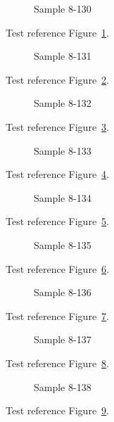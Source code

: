 \begin{figure}[tbhp]
\caption{Sample 8-130}
\label{fig:sample-8-130}
\end{figure}

Test reference Figure~\ref{fig:sample-8-130}.

\begin{figure}[tbhp]
\caption{Sample 8-131}
\label{fig:sample-8-131}
\end{figure}

Test reference Figure~\ref{fig:sample-8-131}.

\begin{figure}[tbhp]
\caption{Sample 8-132}
\label{fig:sample-8-132}
\end{figure}

Test reference Figure~\ref{fig:sample-8-132}.

\begin{figure}[tbhp]
\caption{Sample 8-133}
\label{fig:sample-8-133}
\end{figure}

Test reference Figure~\ref{fig:sample-8-133}.

\begin{figure}[tbhp]
\caption{Sample 8-134}
\label{fig:sample-8-134}
\end{figure}

Test reference Figure~\ref{fig:sample-8-134}.

\begin{figure}[tbhp]
\caption{Sample 8-135}
\label{fig:sample-8-135}
\end{figure}

Test reference Figure~\ref{fig:sample-8-135}.

\begin{figure}[tbhp]
\caption{Sample 8-136}
\label{fig:sample-8-136}
\end{figure}

Test reference Figure~\ref{fig:sample-8-136}.

\begin{figure}[tbhp]
\caption{Sample 8-137}
\label{fig:sample-8-137}
\end{figure}

Test reference Figure~\ref{fig:sample-8-137}.

\begin{figure}[tbhp]
\caption{Sample 8-138}
\label{fig:sample-8-138}
\end{figure}

Test reference Figure~\ref{fig:sample-8-138}.

